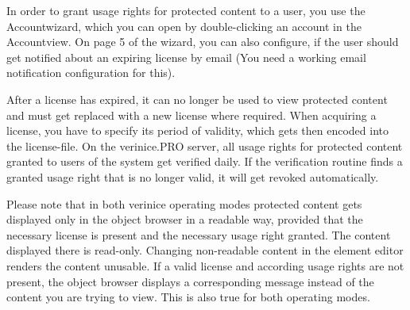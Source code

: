 \documentclass[a4paper,10pt]{book}
\begin{document}
In order to grant usage rights for protected content to a user, you use the Accountwizard, which you can open by double-clicking an account in the Accountview. On page 5 of the wizard, you can also configure, if the user should get notified about an expiring license by email (You need a working email notification configuration for this).

After a license has expired, it can no longer be used to view protected content and must get replaced with a new license where required. When acquiring a license, you have to specify its period of validity, which gets then encoded into the license-file. On the verinice.PRO server, all usage rights for protected content granted to users of the system get verified daily. If the verification routine finds a granted usage right that is no longer valid, it will get revoked automatically.

Please note that in both verinice operating modes protected content gets displayed only in the object browser in a readable way, provided that the necessary license is present and the necessary usage right granted. The content displayed there is read-only. Changing non-readable content in the element editor renders the content unusable. If a valid license and according usage rights are not present, the object browser displays a corresponding message instead of the content you are trying to view. This is also true for both operating modes.
\end{document}
